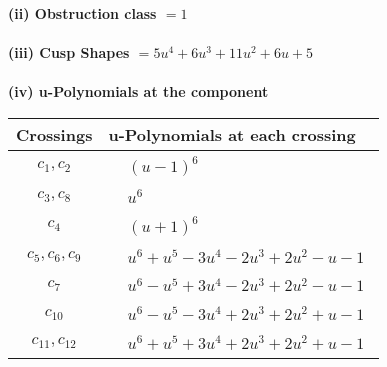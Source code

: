 \documentclass[1p]{elsarticle_modified}
\theoremstyle{definition}
\begin{document}
\flushleft \textbf{(ii) Obstruction class $= 1$}\\~\\
\flushleft \textbf{(iii) Cusp Shapes $= 5 u^4+6 u^3+11 u^2+6 u+5$}\\~\\
\newpage\renewcommand{\arraystretch}{1}
\flushleft \textbf{(iv) u-Polynomials at the component}\newline \\
\begin{tabular}{m{50pt}|m{274pt}}
Crossings & \hspace{64pt}u-Polynomials at each crossing \\
\hline $$\begin{aligned}c_{1},c_{2}\end{aligned}$$&$\begin{aligned}
&(u-1)^6
\end{aligned}$\\
\hline $$\begin{aligned}c_{3},c_{8}\end{aligned}$$&$\begin{aligned}
&u^6
\end{aligned}$\\
\hline $$\begin{aligned}c_{4}\end{aligned}$$&$\begin{aligned}
&(u+1)^6
\end{aligned}$\\
\hline $$\begin{aligned}c_{5},c_{6},c_{9}\end{aligned}$$&$\begin{aligned}
&u^6+u^5-3 u^4-2 u^3+2 u^2- u-1
\end{aligned}$\\
\hline $$\begin{aligned}c_{7}\end{aligned}$$&$\begin{aligned}
&u^6- u^5+3 u^4-2 u^3+2 u^2- u-1
\end{aligned}$\\
\hline $$\begin{aligned}c_{10}\end{aligned}$$&$\begin{aligned}
&u^6- u^5-3 u^4+2 u^3+2 u^2+u-1
\end{aligned}$\\
\hline $$\begin{aligned}c_{11},c_{12}\end{aligned}$$&$\begin{aligned}
&u^6+u^5+3 u^4+2 u^3+2 u^2+u-1
\end{aligned}$\\
\hline
\end{tabular}\\~\\
\end{document}
